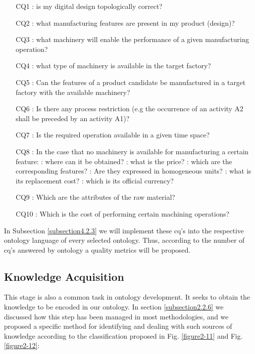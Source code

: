\begin{itemize}
	\item [CQ1]: is my digital design topologically correct?
	\item [CQ2]: what manufacturing features are present in my product (design)?
	\item [CQ3]: what machinery will enable the performance of a given manufacturing operation?
	\item [CQ4]: what type of machinery is available in the target factory?
	\item [CQ5]: Can the features of a product candidate be manufactured in a target factory with the available machinery?
	\item [CQ6]: Is there any process restriction (e.g the occurrence of an activity A2   shall be preceded by an activity A1)?
	\item [CQ7]: Is the required operation available in a given time space?
	\item [CQ8]: In the case that no machinery is available for manufacturing a certain feature:
	\subitem[CQ8.1]: where can it be obtained? 
	\subitem[CQ8.2]: what is the price?
	\subitem[CQ8.3]: which are the corresponding features?
	\subitem[CQ8.4]: Are they expressed in homogeneous units?
	\subitem[CQ8.5]: what is its replacement cost?
	\subitem[CQ8.6]: which is its official currency?  
	\item [CQ9]: Which are the attributes of the raw material?
	\item [CQ10]: Which is the cost of performing certain machining operations? 
	
\end{itemize}

In Subsection \ref{subsection4.2.3} we will implement these \gls{cq}'s into the respective ontology language of every selected ontology. Thus, according to the number of \gls{cq}'s answered by ontology a quality metrics will be proposed.


\subsection{Knowledge Acquisition}\label{4.1.3}

This stage is also a common task in ontology development. It seeks to obtain the knowledge to be encoded in our ontology. In section \ref{subsection2.2.6} we discussed how this step has been managed in most methodologies, and we proposed a specific method for identifying and dealing with such sources of knowledge according to the classification proposed in Fig. \ref{figure2-11} and Fig. \ref{figure2-12}:



